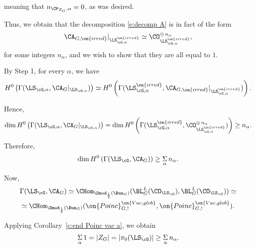 \documentclass[9pt]{amsart}
\theoremstyle{remark}
\theoremstyle{definition}
\theoremstyle{remark}
\newcommand{\corref}[1]{Corollary~\ref{#1}}
\numberwithin{equation}{section}
\begin{document}
\noindent meaning that $n_{\CP_{Z_G},\alpha} = 0$, as was desired.









 \label{sss:step 3}

Thus, we obtain that the decomposition \eqref{e:decomp A} is in fact of the form
\begin{equation} \label{e:decomp A bis}
\CA_{G,\on{irred}}|_{\LS_{\cG,\alpha}^{\on{irred}}}\simeq \CO^{\oplus\, n_\alpha}_{\LS_{\cG,\alpha}^{\on{irred}}},
\end{equation} 
for some integers $n_\alpha$, and we wish to show that they are all equal to $1$.

\medskip

By Step 1, for every $\alpha$, we have
$$H^0\left(\Gamma(\LS_{\cG,\alpha},\CA_G|_{\LS_{\cG,\alpha}})\right)\simeq
H^0\left(\Gamma(\LS^{\on{irred}}_{\cG,\alpha},\CA_{G,\on{irred}}|_{\LS^{\on{irred}}_{\cG,\alpha}})\right).$$

Hence,
$$\dim H^0\left(\Gamma(\LS_{\cG,\alpha},\CA_G|_{\LS_{\cG,\alpha}})\right) =
\dim H^0\left(\Gamma(\LS^{\on{irred}}_{\cG,\alpha},\CO^{\oplus\, n_\alpha}_{\LS_{\cG,\alpha}^{\on{irred}}})\right)
\geq n_\alpha.$$

Therefore,
$$\dim H^0\left(\Gamma(\LS_\cG,\CA_G)\right) \geq \underset{\alpha}\Sigma\, n_\alpha.$$

Now,
\begin{multline} \label{e:global sect}
\Gamma(\LS_\cG,\CA_G)\simeq \CHom_{\Dmod_{\frac{1}{2}}(\Bun_G)}(\BL_G^L(\CO_{\LS_\cG}),\BL_G^L(\CO_{\LS_\cG})) \simeq \\
\simeq \CHom_{\Dmod_{\frac{1}{2}}(\Bun_G)}(\on{Poinc}^{\on{Vac,glob}}_{G,!},\on{Poinc}^{\on{Vac,glob}}_{G,!}).
\end{multline}

Applying \corref{c:end Poinc vac a}, we obtain 
$$\underset{\alpha}\Sigma\, 1=|Z_G|=|\pi_0(\LS_\cG)|\geq \underset{\alpha}\Sigma\, n_\alpha.$$
\end{document}
